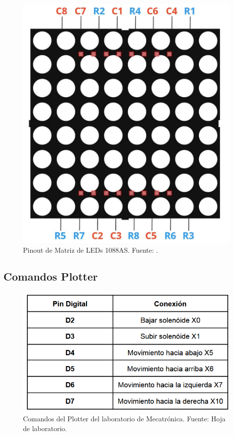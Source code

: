\begin{figure}[H]
  \centering
  \includegraphics[width=0.7\linewidth]{./Anexos/1088ASPinout.jpg}
  \caption{Pinout de Matriz de LEDs 1088AS. Fuente: \cite{softwareparticles_8x8_arduino}.}
  \label{fig:1088as-pinout}
\end{figure}


\subsection{Comandos Plotter}\label{anexo:Comandos_Plotter}

\begin{figure}[H]
  \centering
  \includegraphics[width=0.9\linewidth]{./Anexos/Comandos Plotter.png}
  \caption{Comandos del Plotter del laboratorio de Mecatrónica. Fuente: Hoja de laboratorio.}
  \label{fig:comandos-plotter}
\end{figure}

